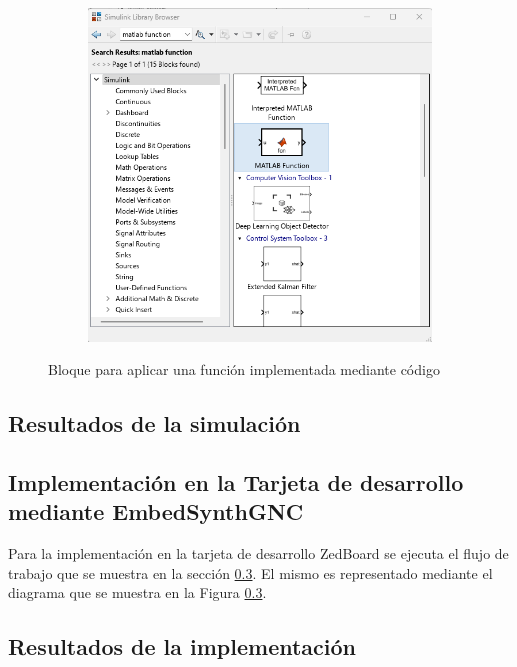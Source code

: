 \begin{figure}[htbp]
\begin{subfigure}[b]{0.45\textwidth}
        \includegraphics[width=\textwidth]{fig/Capitulo5/Caso_de_estudio_IMU/Generador_de_salidas/libreria_bloque_de_funcion.png}
        \caption{}
        \label{fig:config_bloques_func}
    \end{subfigure}
    \caption{Bloque para aplicar una función implementada mediante código}
    \label{fig:bloques_func}
\end{figure}

\subsection{Resultados de la simulación}

\subsection{Implementación en la Tarjeta de desarrollo mediante EmbedSynthGNC}

Para la implementación en la tarjeta de desarrollo ZedBoard se ejecuta el flujo de trabajo que se muestra en la sección \ref{}. El mismo es representado mediante el diagrama que se muestra en la Figura \ref{}.



\subsection{Resultados de la implementación}

